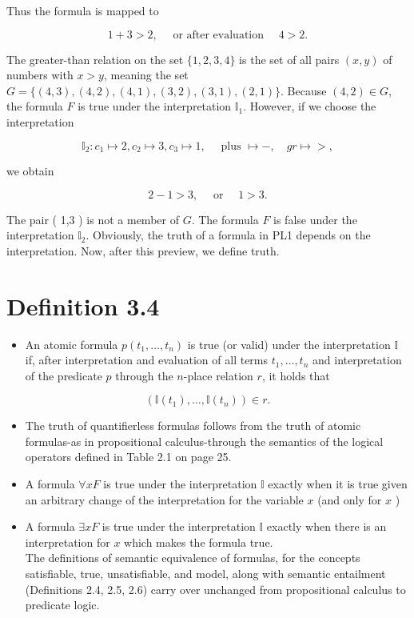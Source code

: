 \documentclass[10pt]{article}
\begin{document}
Thus the formula is mapped to

$$
1+3>2, \quad \text { or after evaluation } \quad 4>2 .
$$

The greater-than relation on the set $\{1,2,3,4\}$ is the set of all pairs $(x, y)$ of numbers with $x>y$, meaning the set $G=\{(4,3),(4,2),(4,1),(3,2),(3,1),(2,1)\}$. Because $(4,2) \in G$, the formula $F$ is true under the interpretation $\mathbb{I}_{1}$. However, if we choose the interpretation

$$
\mathbb{I}_{2}: c_{1} \mapsto 2, c_{2} \mapsto 3, c_{3} \mapsto 1, \quad \text { plus } \mapsto-, \quad g r \mapsto>,
$$

we obtain

$$
2-1>3, \quad \text { or } \quad 1>3 .
$$

The pair ( 1,3 ) is not a member of $G$. The formula $F$ is false under the interpretation $\mathbb{I}_{2}$. Obviously, the truth of a formula in PL1 depends on the interpretation. Now, after this preview, we define truth.

\section*{Definition 3.4}
\begin{itemize}
  \item An atomic formula $p\left(t_{1}, \ldots, t_{n}\right)$ is true (or valid) under the interpretation $\mathbb{I}$ if, after interpretation and evaluation of all terms $t_{1}, \ldots, t_{n}$ and interpretation of the predicate $p$ through the $n$-place relation $r$, it holds that
\end{itemize}

$$
\left(\mathbb{I}\left(t_{1}\right), \ldots, \mathbb{I}\left(t_{n}\right)\right) \in r .
$$

\begin{itemize}
  \item The truth of quantifierless formulas follows from the truth of atomic formulas-as in propositional calculus-through the semantics of the logical operators defined in Table 2.1 on page 25.
  \item A formula $\forall x F$ is true under the interpretation $\mathbb{I}$ exactly when it is true given an arbitrary change of the interpretation for the variable $x$ (and only for $x$ )
  \item A formula $\exists x F$ is true under the interpretation $\mathbb{I}$ exactly when there is an interpretation for $x$ which makes the formula true.\\
The definitions of semantic equivalence of formulas, for the concepts satisfiable, true, unsatisfiable, and model, along with semantic entailment (Definitions 2.4, 2.5, 2.6) carry over unchanged from propositional calculus to predicate logic.
\end{itemize}
\end{document}

